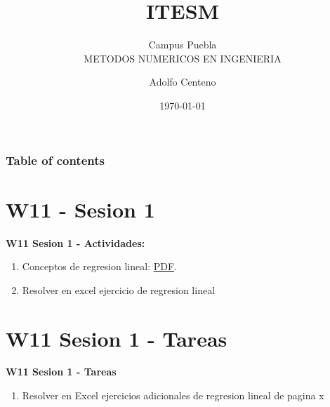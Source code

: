 \documentclass{beamer}
\begin{document}
\title{ITESM}  
\subtitle{Campus Puebla\\METODOS NUMERICOS EN INGENIERIA
}
\author{Adolfo Centeno}
\date{\today} 


\begin{frame}
\titlepage
\end{frame}

\begin{frame}\frametitle{Table of contents}
\tableofcontents
\end{frame} 


\section{W11 - Sesion 1 }

\begin{frame}

\textbf{W11 Sesion 1 - Actividades:}

\begin{enumerate}
\item
	Conceptos de regresion lineal: \href{https://www.youtube.com/watch?v=QS3wqOQabVY}{PDF}.

\item
	Resolver en excel ejercicio de regresion lineal

\end{enumerate} 

\end{frame}


\section{W11 Sesion 1 - Tareas }

\begin{frame}


\textbf{W11 Sesion 1 - Tareas}


\begin{enumerate}
\item

Resolver en Excel ejercicios adicionales de regresion lineal de pagina x


\end{enumerate} 


\end{frame}
\end{document}
